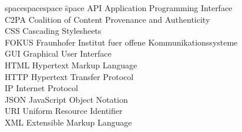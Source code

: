 
\begin{tabbing}
spacespacespace \= space \kill
API	 \> 	Application Programming Interface	 \\
C2PA \> Coalition of Content Provenance and Authenticity \\
CSS	\>	Cascading Stylesheets \\
FOKUS	\>	Fraunhofer Institut fuer offene Kommunikationssysteme \\
GUI	\>	Graphical User Interface \\
HTML	\>	Hypertext Markup Language \\
HTTP	 \> 	Hypertext Transfer Protocol	 \\
IP	 \> 	Internet Protocol	 \\
JSON	\>	JavaScript Object Notation \\
URI	 \> 	Uniform Resource Identifier	 \\
XML	 \> 	Extensible Markup Language	 \\
\end{tabbing}
\endinput
